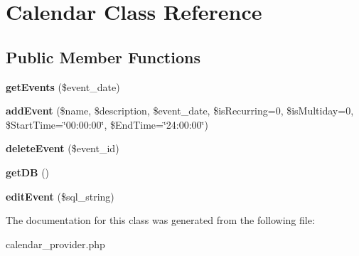 \hypertarget{class_calendar}{}\section{Calendar Class Reference}
\label{class_calendar}
\subsection*{Public Member Functions}
\begin{DoxyCompactItemize}
\item 
\hypertarget{class_calendar_a87ca17d5686b4f1204c0adbfbb01b750}{}\label{class_calendar_a87ca17d5686b4f1204c0adbfbb01b750} 
{\bfseries get\+Events} (\$event\+\_\+date)
\item 
\hypertarget{class_calendar_ac9fd68a2cb13619457a435e88c298149}{}\label{class_calendar_ac9fd68a2cb13619457a435e88c298149} 
{\bfseries add\+Event} (\$name, \$description, \$event\+\_\+date, \$is\+Recurring=0, \$is\+Multiday=0, \$Start\+Time=\char`\"{}00\+:00\+:00\char`\"{}, \$End\+Time=\char`\"{}24\+:00\+:00\char`\"{})
\item 
\hypertarget{class_calendar_ac6d23cc2bdb8c3755193f956ff67dbfc}{}\label{class_calendar_ac6d23cc2bdb8c3755193f956ff67dbfc} 
{\bfseries delete\+Event} (\$event\+\_\+id)
\item 
\hypertarget{class_calendar_ad2161bfcb6203195f22bdfda270d13ee}{}\label{class_calendar_ad2161bfcb6203195f22bdfda270d13ee} 
{\bfseries get\+DB} ()
\item 
\hypertarget{class_calendar_aa3393f2989665825b5e653716489980a}{}\label{class_calendar_aa3393f2989665825b5e653716489980a} 
{\bfseries edit\+Event} (\$sql\+\_\+string)
\end{DoxyCompactItemize}


The documentation for this class was generated from the following file\+:\begin{DoxyCompactItemize}
\item 
calendar\+\_\+provider.\+php\end{DoxyCompactItemize}
